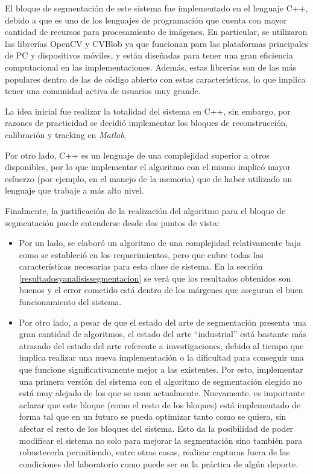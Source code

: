 El bloque de segmentación de este sistema fue implementado en el lenguaje C++, debido a que es uno de los lenguajes de programación que cuenta con mayor cantidad de recursos para procesamiento de imágenes. En particular, se utilizaron las librerías OpenCV \cite{opencv} y CVBlob \cite{cvblob} ya que funcionan para las plataformas principales de PC y dispositivos móviles, y están diseñadas para tener una gran eficiencia computacional en las implementaciones. Además, estas librerías son de las más populares dentro de las de código abierto con estas características, lo que implica tener una comunidad activa de usuarios muy grande.

La idea inicial fue realizar la totalidad del sistema en C++, sin embargo, por razones de practicidad se decidió implementar los bloques de reconstrucción, calibración y tracking en \emph{Matlab}.

Por otro lado, C++ es un lenguaje de una complejidad superior a otros disponibles, por lo que implementar el algoritmo con el mismo implicó mayor esfuerzo (por ejemplo, en el manejo de la memoria) que de haber utilizado un lenguaje que trabaje a más alto nivel.

Finalmente, la justificación de la realización del algoritmo para el bloque de segmentación puede entenderse desde dos puntos de vista: 
\begin{itemize}
 \item Por un lado, se elaboró un algoritmo de una complejidad relativamente baja como se estableció en los requerimientos, pero que cubre todas las características necesarias para esta clase de sistema. En la sección \ref{resultadosyanalisissegmentacion} se verá que los resultados obtenidos son buenos y el error cometido está dentro de los márgenes que aseguran el buen funcionamiento del sistema.
 \item Por otro lado, a pesar de que el estado del arte de segmentación presenta una gran cantidad de algoritmos, el estado del arte ``industrial'' está bastante más atrasado del estado del arte referente a investigaciones, debido al tiempo que implica realizar una nueva implementación o la dificultad para conseguir una que funcione significativamente mejor a las existentes. Por esto, implementar una primera versión del sistema con el algoritmo de segmentación elegido no está muy alejado de los que se usan actualmente. Nuevamente, es importante aclarar que este bloque (como el resto de los bloques) está implementado de forma tal que en un futuro se pueda optimizar tanto como se quiera, sin afectar el resto de los bloques del sistema. Esto da la posibilidad de poder modificar el sistema no solo para mejorar la segmentación sino también para robustecerla permitiendo, entre otras cosas, realizar capturas fuera de las condiciones del laboratorio como puede ser en la práctica de algún deporte.
\end{itemize}



